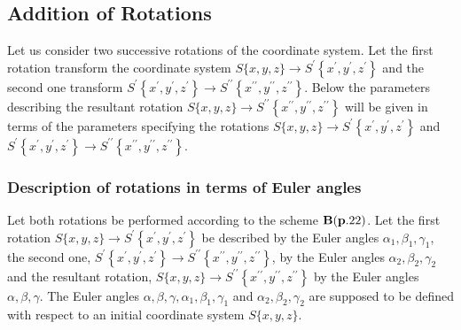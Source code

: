 \subsection{Addition of Rotations}\label{sec:1.4.7}
Let us consider two successive rotations of the coordinate system. Let the first rotation transform the coordinate system \(S\{x, y, z\}\to S^{\prime}\left\{x^{\prime}, y^{\prime}, z^{\prime}\right\}\) and the second one transform \(S^{\prime}\left\{x^{\prime}, y^{\prime}, z^{\prime}\right\}\to S^{\prime \prime}\left\{x^{\prime \prime}, y^{\prime \prime}, z^{\prime \prime}\right\}\).
Below the parameters describing the resultant rotation \(S\{x, y, z\} \rightarrow S^{\prime \prime}\left\{x^{\prime \prime}, y^{\prime \prime}, z^{\prime \prime}\right\}\) will be given in terms of the parameters specifying the rotations \(S\{x, y, z\} \rightarrow S^{\prime}\left\{x^{\prime}, y^{\prime}, z^{\prime}\right\}\) and \(S^{\prime}\left\{x^{\prime}, y^{\prime}, z^{\prime}\right\} \rightarrow S^{\prime \prime}\left\{x^{\prime \prime}, y^{\prime \prime}, z^{\prime \prime}\right\}\).

\subsubsection{Description of rotations in terms of Euler angles}
Let both rotations be performed according to the scheme \(\mathbf{B}(\mathbf{p} .22)\). Let the first rotation \(S\{x, y, z\} \rightarrow S^{\prime}\left\{x^{\prime}, y^{\prime}, z^{\prime}\right\}\) be described by the Euler angles \(\alpha_{1}, \beta_{1}, \gamma_{1}\), the second one, \(S^{\prime}\left\{x^{\prime}, y^{\prime}, z^{\prime}\right\} \rightarrow S^{\prime \prime}\left\{x^{\prime \prime}, y^{\prime \prime}, z^{\prime \prime}\right\}\), by the Euler angles \(\alpha_{2}, \beta_{2}, \gamma_{2}\) and the resultant rotation, \(S\{x, y, z\} \rightarrow S^{\prime \prime}\left\{x^{\prime \prime}, y^{\prime \prime}, z^{\prime \prime}\right\}\) by the Euler angles \(\alpha, \beta, \gamma\). The Euler angles \(\alpha, \beta, \gamma, \alpha_{1}, \beta_{1}, \gamma_{1}\) and \(\alpha_{2}, \beta_{2}, \gamma_{2}\) are supposed to be defined with respect to an initial coordinate system \(S\{x, y, z\}\).


